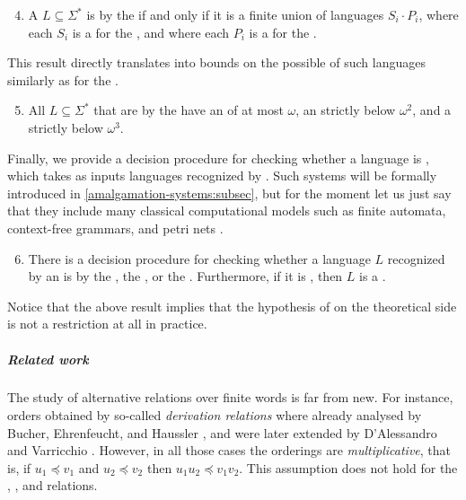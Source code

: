 {
\renewcommand{\labelenumi}{R\arabic{enumi}}
\begin{enumerate}
	\setcounter{enumi}{3}
    \item A  $L \subseteq \Sigma^*$ is  by the  if and only if it is a finite union of languages $S_i \cdot P_i$, where each $S_i$ 
        is a  for the ,
        and where
        each $P_i$ is a  for the .
\end{enumerate}
}

This result directly translates into bounds on the possible 
of such languages similarly as for the .
{
\renewcommand{\labelenumi}{R\arabic{enumi}}
\begin{enumerate}
    \setcounter{enumi}{4}
    \item All 
            $L \subseteq \Sigma^*$ that are  by the 
            have an  of at most $\omega$,
            an  strictly below $\omega^2$, and
            a  strictly below $\omega^3$.
\end{enumerate}
}

\AP
Finally, we provide a decision procedure for checking whether a language is
, which takes as inputs languages recognized
by  \cite{ASZZ24}. Such systems will be
formally introduced in \cref{amalgamation-systems:subsec}, but for the moment
let us just say that they include many classical computational models such as
finite automata, context-free grammars, and petri nets \cite{ASZZ24}. 
{
\renewcommand{\labelenumi}{R\arabic{enumi}}
\begin{enumerate}
    \setcounter{enumi}{5}
    \item There is a decision procedure for checking whether a language $L$ recognized by an  is  by the , the , or the . Furthermore, if it is , then $L$ is a .
\end{enumerate}
}
Notice that the above result implies that the hypothesis of
 on the theoretical side is not a restriction at all in
practice.


\subparagraph{Related work} The study of alternative 
relations over finite words is far from new. For instance, orders obtained by
so-called \emph{derivation relations} where already analysed by Bucher,
Ehrenfeucht, and Haussler \cite{BUEUD85}, and were later extended by
D'Alessandro and Varricchio \cite{ALVA03,ALVA06}. However, in all those cases
the orderings are \emph{multiplicative}, that is, if $u_1 \preceq v_1$ and $u_2
\preceq v_2$ then $u_1u_2 \preceq v_1v_2$. This assumption does not hold for
the , , and  relations.

